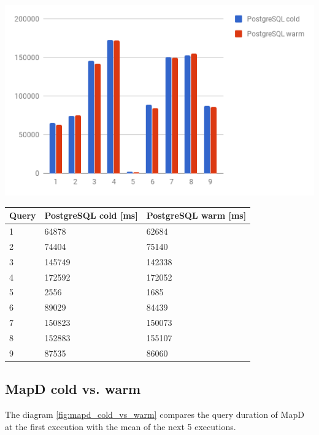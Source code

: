  \begin{minipage}{\textwidth}
  \begin{minipage}[b]{0.59\textwidth}
    \centering
     \includegraphics[width=1.0\textwidth,height=1.0\textheight,keepaspectratio]{images/postgres_cold_vs_warm.png}
    \label{fig:postgres_cold_vs_warm}
  \end{minipage}
  \hfill
  \begin{minipage}[b]{0.39\textwidth}
    \centering
  \begin{tabular}{ |p{1cm}|p{2cm}|p{2cm}| }
    \hline
    Query & PostgreSQL cold [ms] & PostgreSQL warm [ms] \\
    \hline
    1 & 64878 & 62684 \\
    2 & 74404 & 75140 \\
    3 & 145749 & 142338 \\
    4 & 172592 & 172052 \\
    5 & 2556 & 1685 \\
    6 & 89029 & 84439 \\
    7 & 150823 & 150073 \\
    8 & 152883 & 155107 \\
    9 & 87535 & 86060 \\
    \hline
\end{tabular}
            \label{tab:postgres_cold_vs_warm}
    \end{minipage}
 \end{minipage}


\newpage
\subsection{MapD cold vs. warm}
The diagram \ref{fig:mapd_cold_vs_warm} compares the query duration of MapD at the first execution with the mean of the next 5 executions.


